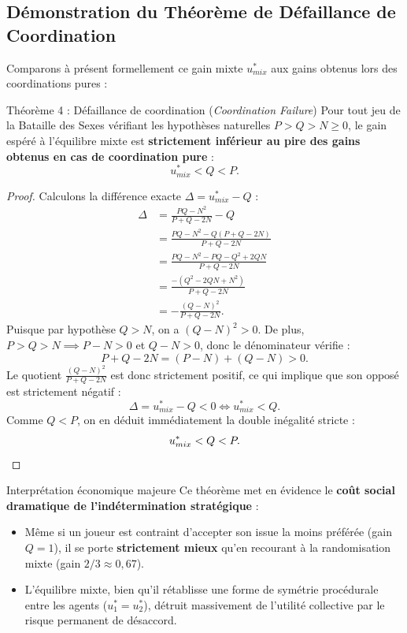 \documentclass[11pt,a4paper]{article}
\begin{document}
\subsection{Démonstration du Théorème de Défaillance de Coordination}
Comparons à présent formellement ce gain mixte $u_{mix}^*$ aux gains obtenus lors des coordinations pures :

\begin{propbox}{Théorème 4 : Défaillance de coordination (\emph{Coordination Failure})}
Pour tout jeu de la Bataille des Sexes vérifiant les hypothèses naturelles $P > Q > N \ge 0$, le gain espéré à l'équilibre mixte est \textbf{strictement inférieur au pire des gains obtenus en cas de coordination pure} :
\begin{equation}
\boxed{u_{mix}^* < Q < P}.
\end{equation}
\end{propbox}

\begin{proof}
Calculons la différence exacte $\Delta = u_{mix}^* - Q$ :
\begin{align}
\Delta &= \frac{PQ - N^2}{P + Q - 2N} - Q \nonumber \\
       &= \frac{PQ - N^2 - Q(P + Q - 2N)}{P + Q - 2N} \nonumber \\
       &= \frac{PQ - N^2 - PQ - Q^2 + 2QN}{P + Q - 2N} \nonumber \\
       &= \frac{- (Q^2 - 2QN + N^2)}{P + Q - 2N} \nonumber \\
       &= - \frac{(Q - N)^2}{P + Q - 2N}.
\end{align}
Puisque par hypothèse $Q > N$, on a $(Q - N)^2 > 0$. De plus, $P > Q > N \implies P - N > 0$ et $Q - N > 0$, donc le dénominateur vérifie :
\[
P + Q - 2N = (P - N) + (Q - N) > 0.
\]
Le quotient $\frac{(Q - N)^2}{P + Q - 2N}$ est donc strictement positif, ce qui implique que son opposé est strictement négatif :
\[
\Delta = u_{mix}^* - Q < 0 \iff u_{mix}^* < Q.
\]
Comme $Q < P$, on en déduit immédiatement la double inégalité stricte :
\[
u_{mix}^* < Q < P. \qedhere
\]
\end{proof}

\begin{rembox}{Interprétation économique majeure}
Ce théorème met en évidence le \textbf{coût social dramatique de l'indétermination stratégique} :
\begin{itemize}[leftmargin=1.5em]
    \item Même si un joueur est contraint d'accepter son issue la moins préférée (gain $Q = 1$), il se porte \textbf{strictement mieux} qu'en recourant à la randomisation mixte (gain $2/3 \approx 0{,}67$).
    \item L'équilibre mixte, bien qu'il rétablisse une forme de symétrie procédurale entre les agents ($u_1^* = u_2^*$), détruit massivement de l'utilité collective par le risque permanent de désaccord.
\end{itemize}
\end{rembox}
\end{document}
